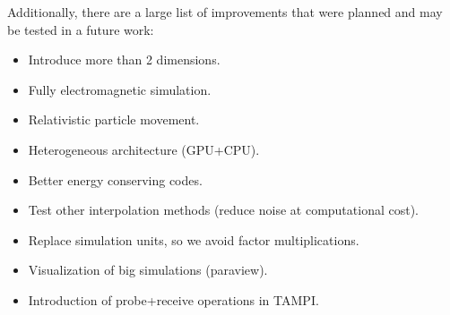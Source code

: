 Additionally, there are a large list of improvements that were planned and may 
be tested in a future work:

\begin{itemize}
\item Introduce more than 2 dimensions.
\item Fully electromagnetic simulation.
\item Relativistic particle movement.
\item Heterogeneous architecture (GPU+CPU).
\item Better energy conserving codes.
\item Test other interpolation methods (reduce noise at computational cost).
\item Replace simulation units, so we avoid factor multiplications.
\item Visualization of big simulations (paraview).
\item Introduction of probe+receive operations in TAMPI.
\end{itemize}
